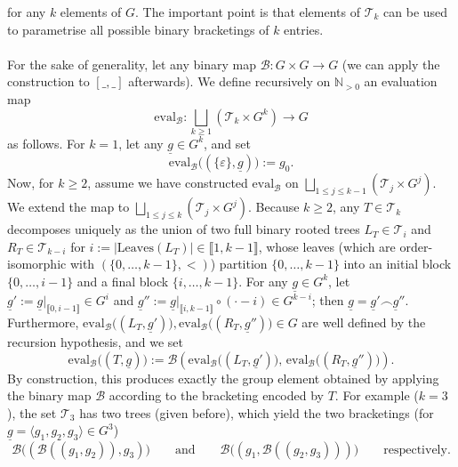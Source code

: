 \documentclass[11pt, a4paper, oneside]{article}
\theoremstyle{remark}
\theoremstyle{lemma}
\begin{document}
for any \(k\) elements of \(G\). The important point is that elements of \(\mathcal{T}_k\) 
can be used to parametrise all possible binary bracketings of \(k\) entries. 
\\\\
For the sake of generality, let any binary map \(\mathcal{B} : G \times G \longrightarrow G\) (we can apply the construction to \([\_,\_]\) afterwards). We define recursively on \(\mathbb{N}_{>0}\) an evaluation map
\[
\mathrm{eval}_{\mathcal{B}} : \bigsqcup_{k \geq 1} \left(\mathcal{T}_k \times G^k\right) 
\longrightarrow G
\]
as follows. For \(k=1\), let any \(\underline{g} \in G^k\), and set
\[
\mathrm{eval}_{\mathcal{B}}\bigl((\{\varepsilon\}, \underline{g})\bigr) := g_0.
\]
Now, for \(k \geq 2\), assume we have constructed \(\mathrm{eval}_{\mathcal{B}}\) on 
\(\bigsqcup_{1\leq j\leq k-1}\left(\mathcal{T}_j \times G^j\right)\). We extend the map to \(\bigsqcup_{1\leq j\leq k}\left(\mathcal{T}_j \times G^j\right)\). Because $k\geq 2$, any \(T \in \mathcal{T}_k\) decomposes uniquely as the union of two full binary rooted trees 
\(L_T \in \mathcal{T}_{i}\) and \(R_T \in \mathcal{T}_{k-i}\) for 
\(i := \left|\mathrm{Leaves}\!\left(L_T\right)\right| \in \llbracket 1,k-1\rrbracket\), whose leaves (which are order-isomorphic with 
\(\left(\{0,\dots,k-1\},<\right)\)) partition \(\{0,\dots,k-1\}\) into an initial block 
\(\{0,\dots,i-1\}\) and a final block \(\{i,\dots,k-1\}\). 
For any \(\underline{g} \in G^k\), let 
\(\underline{g}' := \underline{g}\big|_{\llbracket 0,i-1\rrbracket} \in G^{i}\) 
and 
\(\underline{g}'' := \underline{g}\big|_{\llbracket i,k-1\rrbracket}\circ(\cdot-i)\in G^{k-i}\); 
then \(\underline{g} = \underline{g}' \frown \underline{g}''\). 
Furthermore, \(\mathrm{eval}_{\mathcal{B}}\bigl((L_T,\underline{g}')\bigr),\mathrm{eval}_{\mathcal{B}}\bigl((R_T,\underline{g}'')\bigr)\in G\) are well defined by the recursion hypothesis, and we set
\[
\mathrm{eval}_{\mathcal{B}}\bigl((T,\underline{g})\bigr)
:= \mathcal{B}\!\left(
\mathrm{eval}_{\mathcal{B}}\bigl((L_T,\underline{g}')\bigr), \,
\mathrm{eval}_{\mathcal{B}}\bigl((R_T,\underline{g}'')\bigr)
\right).
\]
By construction, this produces exactly the group element obtained by applying the binary map \(\mathcal{B}\) according to the bracketing encoded by \(T\). For example (\(k=3\)), the set \(\mathcal{T}_3\) has two trees (given before), which yield the two bracketings (for $\underline{g}=\langle g_1,g_2, g_3\rangle\in G^3$)
\[
\mathcal{B}\!\bigl((\mathcal{B}((g_1,g_2)), g_3)\bigr)
\qquad\text{and}\qquad
\mathcal{B}\!\bigl((g_1, \mathcal{B}((g_2,g_3)))\bigr)\qquad\text{respectively}.
\]
\end{document}
